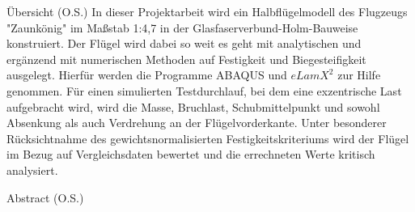 Übersicht (O.S.)
In dieser Projektarbeit wird ein Halbflügelmodell des Flugzeugs "Zaunkönig" im Maßstab 1:4,7 in der Glasfaserverbund-Holm-Bauweise konstruiert. Der Flügel wird dabei so weit es geht mit analytischen und ergänzend mit numerischen Methoden auf Festigkeit und Biegesteifigkeit ausgelegt. Hierfür werden die Programme ABAQUS und $ eLamX^{2} $ zur Hilfe genommen. Für einen simulierten Testdurchlauf, bei dem eine exzentrische Last aufgebracht wird, wird die Masse, Bruchlast, Schubmittelpunkt und sowohl Absenkung als auch Verdrehung an der Flügelvorderkante. Unter besonderer Rücksichtnahme des gewichtsnormalisierten Festigkeitskriteriums wird der Flügel im Bezug auf Vergleichsdaten bewertet und die errechneten Werte kritisch analysiert.
\newpage

Abstract (O.S.)

